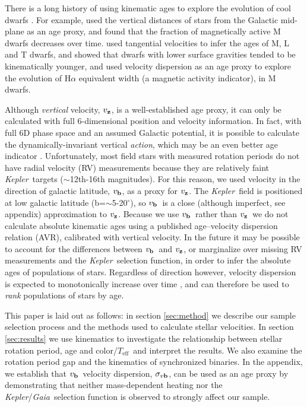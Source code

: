 \documentclass{aastex63}
\newcommand{\eg}{{\it e.g.}}
\newcommand{\kepler}{{\it Kepler}}
\newcommand{\gaia}{{\it Gaia}}
\newcommand{\teff}{$T_{\mathrm{eff}}$}
\newcommand{\degrees}{$^\circ$}
\newcommand{\vz}{$v_{\bf z}$}
\newcommand{\vb}{$v_{\bf b}$}
\newcommand{\sigmavb}{$\sigma_{v{\bf b}}$}
\newcommand{\racomment}[1]{{\color{blue}#1}}
\begin{document}
\racomment{ There is a long history of using kinematic ages to explore the
evolution of cool dwarfs \citep[\eg][]{reid1995, gizis2000, west2004,
west2006, schmidt2007, faherty2009, kiman2019}.
For example, \citet{west2004, west2006} used the vertical distances of stars
from the Galactic mid-plane as an age proxy, and found that the fraction of
magnetically active M dwarfs decreases over time.
\citet{faherty2009} used tangential velocities to infer the ages of M, L and T
dwarfs, and showed that dwarfs with lower surface gravities tended to be
kinematically younger, and \citet{kiman2019} used velocity dispersion as an
age proxy to explore the evolution of H$\alpha$ equivalent width (a magnetic
activity indicator), in M dwarfs.
}

Although {\it vertical} velocity, \vz, is \racomment{a well-established} age
proxy, it can only be calculated with full 6-dimensional position and velocity
information.
In fact, with full 6D phase space and an assumed Galactic potential, it is
possible to calculate the dynamically-invariant vertical {\it action}, which may
be an even better age indicator \citep{beane2018, ting2019}.
Unfortunately, most field stars with measured rotation periods do not have
radial velocity (RV) measurements because they are relatively faint \kepler\
targets ($\sim$12th-16th magnitudes).
For this reason, we used velocity in the direction of galactic latitude, \vb,
as a proxy for \vz.
The \kepler\ field is positioned at low galactic latitude
(b=$\sim$5-20\degrees), so \vb\ is a close (although imperfect, see
appendix) approximation to \vz.
Because we use \vb\ rather than \vz\, we do not calculate absolute kinematic
ages using a published age--velocity dispersion relation (AVR), calibrated with
vertical velocity.
In the future it may be possible to account for the differences between \vb\
and \vz, or marginalize over missing RV measurements and the \kepler\
selection function, in order to infer the absolute ages of populations of
stars.
Regardless of direction however, velocity dispersion is expected to
monotonically increase over time \citep[\eg][]{holmberg2009}, and can
therefore be used to {\it rank} populations of stars by age.

This paper is laid out as follows: in section \ref{sec:method} we describe our
sample selection process and the methods used to calculate stellar
velocities.
In section \ref{sec:results} we use kinematics to investigate the relationship
between stellar rotation period, age and color/\teff\ and interpret the
results.
We also examine the rotation period gap and the kinematics of synchronized
binaries.
In the appendix, we establish that \vb\ velocity dispersion, \sigmavb, can be
used as an age proxy by demonstrating that neither mass-dependent heating nor
the \kepler/\gaia\ selection function is observed to strongly affect our
sample.
\end{document}
